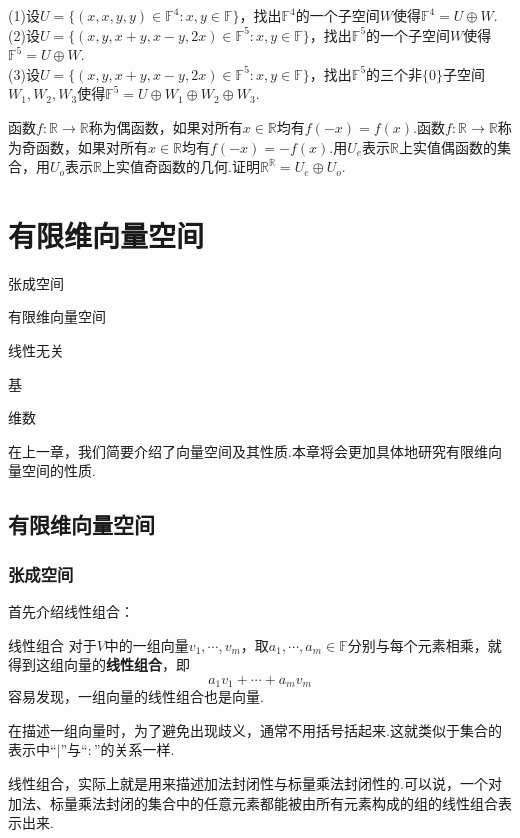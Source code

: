\documentclass[lang=cn, zihao=5]{elegantbook}
\newcommand{\R}{\mathbb{R}}
\newcommand{\F}{\mathbb{F}}
\begin{document}
\begin{exercise}
	(1)设$U = \{ (x,x,y,y) \in \F ^{4} : x,y \in \F \}$，找出$\F ^{4}$的一个子空间$W$使得$\F ^{4} = U \oplus W$. \\
	(2)设$U = \{ (x,y,x+y,x-y,2x) \in \F ^{5} : x,y \in \F \}$，找出$\F ^{5}$的一个子空间$W$使得$\F ^{5} = U \oplus W$. \\
	(3)设$U = \{ (x,y,x+y,x-y,2x) \in \F ^{5} : x,y \in \F \}$，找出$\F ^{5}$的三个非$\{ 0 \}$子空间$W_1,W_2,W_3$使得$\F ^{5} = U \oplus W_1 \oplus W_2 \oplus W_3$.
\end{exercise}

\begin{exercise}
	函数$f: \R \to \R$称为偶函数，如果对所有$x \in \R$均有$f(-x) = f(x)$.函数$f: \R \to \R$称为奇函数，如果对所有$x \in \R$均有$f(-x) = -f(x)$.用$U_e$表示$\R$上实值偶函数的集合，用$U_o$表示$\R$上实值奇函数的几何.证明$\R ^{\R} = U_e \oplus U_o$.
\end{exercise}


\chapter{有限维向量空间}

\begin{introduction}
	\item 张成空间
	\item 有限维向量空间
	\item 线性无关
	\item 基
	\item 维数
\end{introduction}

在上一章，我们简要介绍了向量空间及其性质.本章将会更加具体地研究有限维向量空间的性质.

\section{有限维向量空间}

\subsection{张成空间}

首先介绍线性组合：

\begin{definition}{线性组合}
	对于$V$中的一组向量$v_1, \cdots ,v_m$，取$a_1, \cdots ,a_m \in \F$分别与每个元素相乘，就得到这组向量的\textbf{线性组合}，即$$a_1v_1 + \cdots + a_mv_m$$
	容易发现，一组向量的线性组合也是向量.
\end{definition}
\begin{remark}
	在描述一组向量时，为了避免出现歧义，通常不用括号括起来.这就类似于集合的表示中“$|$”与“$:$”的关系一样.
\end{remark}
\begin{remark}
	线性组合，实际上就是用来描述加法封闭性与标量乘法封闭性的.可以说，一个对加法、标量乘法封闭的集合中的任意元素都能被由所有元素构成的组的线性组合表示出来.
\end{remark}
\end{document}
